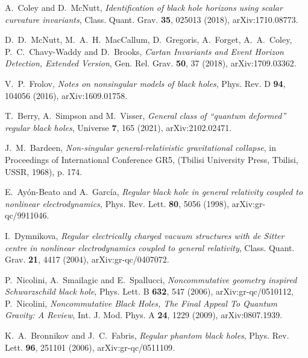 \documentclass[aps,prd,a4paper,twocolumn,showpacs,showkeys,preprintnumbers,amsmath,amssymb,nofootinbib,usenames,dvipsnames]{revtex4-2}
\begin{document}
\begin{thebibliography}{99}
A.~Coley and D.~McNutt,
{\it Identification of black hole horizons using scalar curvature invariants},
Class. Quant. Grav. \textbf{35}, 025013 (2018),
arXiv:1710.08773.

D.~D.~McNutt, M.~A.~H.~MacCallum, D.~Gregoris, A.~Forget, A.~A.~Coley, P.~C.~Chavy-Waddy and D.~Brooks,
{\it Cartan Invariants and Event Horizon Detection, Extended Version},
Gen. Rel. Grav. \textbf{50}, 37 (2018),
arXiv:1709.03362.


V.~P.~Frolov,
{\it Notes on nonsingular models of black holes},
Phys. Rev. D \textbf{94}, 104056 (2016),
arXiv:1609.01758.

T.~Berry, A.~Simpson and M.~Visser,
{\it General class of ``quantum deformed'' regular black holes},
Universe \textbf{7}, 165 (2021),
arXiv:2102.02471.


J.~M.~Bardeen,
{\it Non-singular general-relativistic gravitational collapse}, 
in Proceedings  of   International  Conference GR5, (Tbilisi University Press, Tbilisi, USSR, 1968), p. 174.

E.~Ay\'on-Beato and A.~Garc\'ia,
{\it Regular black hole in general relativity coupled to nonlinear electrodynamics,}
Phys. Rev. Lett. \textbf{80}, 5056 (1998),
arXiv:gr-qc/9911046.

I.~Dymnikova,
{\it Regular electrically charged vacuum structures with de Sitter centre in nonlinear electrodynamics coupled to general relativity},
Class. Quant. Grav. \textbf{21}, 4417 (2004),
arXiv:gr-qc/0407072.

P.~Nicolini, A.~Smailagic and E.~Spallucci,
{\it Noncommutative geometry inspired Schwarzschild black hole},
Phys. Lett. B \textbf{632}, 547 (2006),
arXiv:gr-qc/0510112,
%
P.~Nicolini,
{\it Noncommutative Black Holes, The Final Appeal To Quantum Gravity: A Review}, 
Int. J. Mod. Phys. A \textbf{24}, 1229 (2009),
arXiv:0807.1939.

K.~A.~Bronnikov and J.~C.~Fabris,
{\it Regular phantom black holes},
Phys. Rev. Lett. \textbf{96}, 251101 (2006),
arXiv:gr-qc/0511109.


\end{thebibliography}
\end{document}
